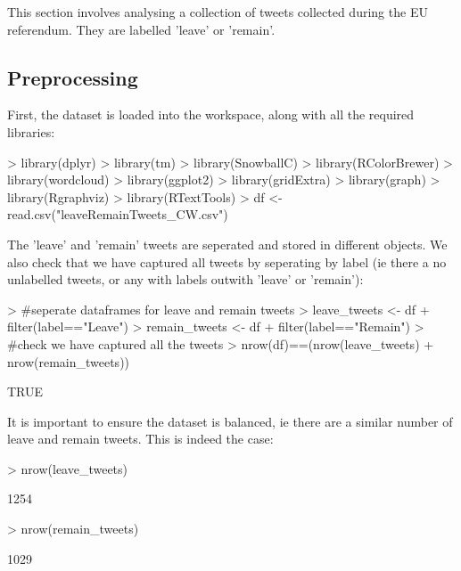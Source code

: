 \documentclass[10pt]{article}
\begin{document}
This section involves analysing a collection of tweets collected during the EU referendum. They are labelled 'leave' or 'remain'.



\subsection{Preprocessing}

First, the dataset is loaded into the workspace, along with all the required libraries:

\begin{Schunk}
\begin{Sinput}
> library(dplyr)
> library(tm)
> library(SnowballC)
> library(RColorBrewer)
> library(wordcloud)
> library(ggplot2)
> library(gridExtra)
> library(graph)
> library(Rgraphviz)
> library(RTextTools)
> df <- read.csv("leaveRemainTweets_CW.csv")
\end{Sinput}
\end{Schunk}
The 'leave' and 'remain' tweets are seperated and stored in different objects. We also check that we have captured all tweets by seperating by label (ie there a no unlabelled tweets, or any with labels outwith 'leave' or 'remain'):
\begin{Schunk}
\begin{Sinput}
> #seperate dataframes for leave and remain tweets
> leave_tweets <- df%
+   filter(label=="Leave")
> remain_tweets <- df%
+   filter(label=="Remain")
> #check we have captured all the tweets
> nrow(df)==(nrow(leave_tweets) + nrow(remain_tweets))
\end{Sinput}
\begin{Soutput}
[1] TRUE
\end{Soutput}
\end{Schunk}
It is important to ensure the dataset is balanced, ie there are a similar number of leave and remain tweets. This is indeed the case:
\begin{Schunk}
\begin{Sinput}
> nrow(leave_tweets)
\end{Sinput}
\begin{Soutput}
[1] 1254
\end{Soutput}
\begin{Sinput}
> nrow(remain_tweets)
\end{Sinput}
\begin{Soutput}
[1] 1029
\end{Soutput}
\end{Schunk}
\end{document}
